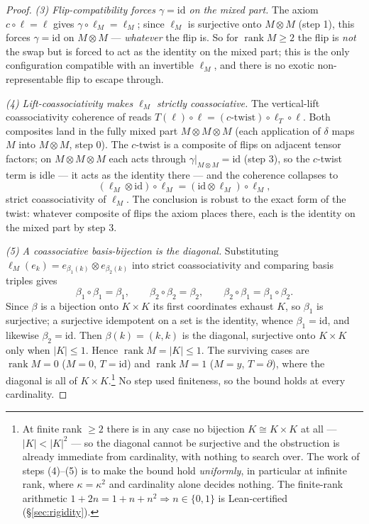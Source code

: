 \documentclass[11pt]{article}
\theoremstyle{definition}
\newcommand{\id}{\mathrm{id}}
\newcommand{\rank}{\operatorname{rank}}
\begin{document}
\begin{proof}
\emph{(3) Flip-compatibility forces $\gamma=\id$ on the mixed part.} The axiom $c\circ\ell=\ell$ gives
$\gamma\circ\ell_M=\ell_M$; since $\ell_M$ is surjective onto $M\otimes M$ (step 1), this forces
$\gamma=\id$ on $M\otimes M$ --- \emph{whatever} the flip is. So for $\rank M\ge2$ the flip is
\emph{not} the swap but is forced to act as the identity on the mixed part; this is the only
configuration compatible with an invertible $\ell_M$, and there is no exotic non-representable flip to
escape through.

\emph{(4) Lift-coassociativity makes $\ell_M$ strictly coassociative.} The vertical-lift
coassociativity coherence of \cite{CockettCruttwell2014} reads $T(\ell)\circ\ell=(c\text{-twist})\circ
\ell_T\circ\ell$. Both composites land in the fully mixed part $M\otimes M\otimes M$ (each application
of $\delta$ maps $M$ into $M\otimes M$, step 0). The $c$-twist is a composite of flips on adjacent
tensor factors; on $M\otimes M\otimes M$ each acts through $\gamma|_{M\otimes M}=\id$ (step 3), so the
$c$-twist term is idle --- it acts as the identity there --- and the coherence collapses to
\[
  (\ell_M\otimes\id)\circ\ell_M=(\id\otimes\ell_M)\circ\ell_M,
\]
strict coassociativity of $\ell_M$. The conclusion is robust to the exact form of the twist: whatever
composite of flips the axiom places there, each is the identity on the mixed part by step 3.

\emph{(5) A coassociative basis-bijection is the diagonal.} Substituting
$\ell_M(e_k)=e_{\beta_1(k)}\otimes e_{\beta_2(k)}$ into strict coassociativity and comparing basis
triples gives
\[
  \beta_1\circ\beta_1=\beta_1,\qquad \beta_2\circ\beta_2=\beta_2,\qquad
  \beta_2\circ\beta_1=\beta_1\circ\beta_2.
\]
Since $\beta$ is a bijection onto $K\times K$ its first coordinates exhaust $K$, so $\beta_1$ is
surjective; a surjective idempotent on a set is the identity, whence $\beta_1=\id$, and likewise
$\beta_2=\id$. Then $\beta(k)=(k,k)$ is the diagonal, surjective onto $K\times K$ only when $|K|\le1$.
Hence $\rank M=|K|\le1$. The surviving cases are $\rank M=0$ ($M=0$, $T=\id$) and $\rank M=1$ ($M=y$,
$T=\partial$), where the diagonal is all of $K\times K$.\footnote{At finite rank $\ge2$ there is in
any case no bijection $K\cong K\times K$ at all --- $|K|<|K|^2$ --- so the diagonal cannot be
surjective and the obstruction is already immediate from cardinality, with nothing to search over. The
work of steps (4)--(5) is to make the bound hold \emph{uniformly}, in particular at infinite rank,
where $\kappa=\kappa^2$ and cardinality alone decides nothing. The finite-rank arithmetic
$1+2n=1+n+n^2\Rightarrow n\in\{0,1\}$ is Lean-certified (\S\ref{sec:rigidity}).} No step used
finiteness, so the bound holds at every cardinality.
\end{proof}
\end{document}
